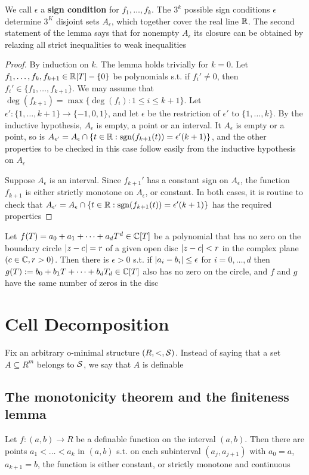\documentclass[11pt]{article}
\begin{document}
We call \(\epsilon\) a \textbf{sign condition} for \(f_1,\dots,f_k\). The \(3^k\) possible sign conditions \(\epsilon\)
determine \(3^K\) disjoint sets \(A_\epsilon\), which together cover the real line \(\mathbb{R}\). The second
statement of the lemma says that for nonempty \(A_\epsilon\) its closure can be obtained by relaxing
all strict inequalities to weak inequalities

\begin{proof}
By induction on \(k\). The lemma holds trivially for \(k=0\). Let \(f_1,\dots,f_k,f_{k+1}\in\mathbb{R}[T]-\{0\}\)
be polynomials s.t. if \(f_i'\neq 0\), then \(f_i'\in\{f_1,\dots,f_{k+1}\}\). We may assume
that \(\deg(f_{k+1})=\max\{\deg(f_i):1\le i\le k+1\}\). Let \(\epsilon':\{1,\dots,k+1\}\to\{-1,0,1\}\), and let \(\epsilon\) be the
restriction of \(\epsilon'\) to \(\{1,\dots,k\}\). By the inductive hypothesis, \(A_\epsilon\) is empty, a point or
an interval. It \(A_\epsilon\) is empty or a point, so
is \(A_{\epsilon'}=A_\epsilon\cap\{t\in\mathbb{R}:\operatorname{sgn}(f_{k+1}(t))=\epsilon'(k+1)\}\), and the other properties to be checked in this
case follow easily from the inductive hypothesis on \(A_\epsilon\)

Suppose \(A_\epsilon\) is an interval. Since \(f_{k+1}'\) has a constant sign on \(A_\epsilon\), the
function \(f_{k+1}\) is either strictly monotone on \(A_\epsilon\), or constant. In both cases, it is
routine to check that \(A_{\epsilon'}=A_\epsilon\cap\{t\in\mathbb{R}:\operatorname{sgn}(f_{k+1}(t))=\epsilon'(k+1)\}\) has the required properties
\end{proof}

\begin{lemma}
Let \(f(T)=a_0+a_1+\dots+a_dT^d\in\mathbb{C}[T]\) be a polynomial that has no zero on the boundary
circle \(\abs{z-c}=r\) of a given open disc \(\abs{z-c}<r\) in the complex plane \((c\in\mathbb{C},r>0)\).
Then there is \(\epsilon>0\) s.t. if \(\abs{a_i-b_i}\le\epsilon\) for \(i=0,\dots,d\)
then \(g(T):=b_0+b_1T+\dots+b_dT_d\in\mathbb{C}[T]\) also has no zero on the circle, and \(f\) and \(g\) have
the same number of zeros in the disc
\end{lemma}
\section{Cell Decomposition}
\label{sec:org94b25fe}
Fix an arbitrary o-minimal structure \((R,<,\mathcal{S})\). Instead of saying that a set \(A\subseteq R^m\) belongs
to \(\mathcal{S}\), we say that \(A\) is definable
\subsection{The monotonicity theorem and the finiteness lemma}
\label{sec:orgb46e75b}
\begin{theorem}
Let \(f:(a,b)\to R\) be a definable function on the interval \((a,b)\). Then there are
points \(a_1<\dots<a_k\) in \((a,b)\) s.t. on each subinterval \((a_j,a_{j+1})\)
with \(a_0=a\), \(a_{k+1}=b\), the function is either constant, or strictly monotone and continuous
\end{theorem}
\end{document}
